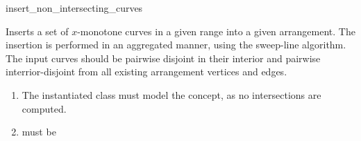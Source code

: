\ccRefPageBegin

\begin{ccRefFunction}{insert_non_intersecting_curves}

\ccDefinition

Inserts a set of $x$-monotone curves in a given range into a given
arrangement. The insertion is performed in an aggregated manner, using
the sweep-line algorithm. The input curves should be pairwise disjoint
in their interior and pairwise interrior-disjoint from all existing
arrangement vertices and edges. 



\begin{enumerate}
\item The instantiated  class must model the
   concept, as no intersections are computed.
\item {} must be 
\end{enumerate}

\end{ccRefFunction}

\ccRefPageEnd
